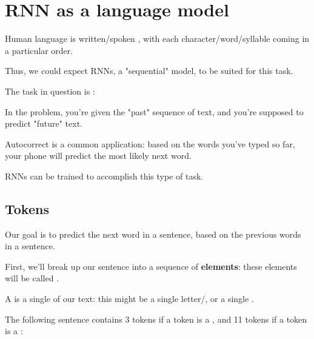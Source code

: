 \pagebreak

\section{RNN as a language model}

    Human language is written/spoken , with each character/word/syllable coming in a particular order.

    Thus, we could expect RNNs, a "sequential" model, to be suited for this task.

    The task in question is :\\

    \begin{definition}
        In the  problem, you're given the "past" sequence of text, and you're supposed to predict "future" text.
    \end{definition}

    \miniex Autocorrect is a common application: based on the words you've typed so far, your phone will predict the most likely next word.

    RNNs can be trained to accomplish this type of task.

    \subsection{Tokens}

        Our goal is to  predict the next word in a sentence, based on the previous words in a sentence.

        First, we'll break up our sentence into a sequence of \textbf{elements}: these elements will be called .\\

        \begin{definition}
            A  is a single  of our text: this might be a single letter/, or a single .
        \end{definition}
        

        \miniex The following sentence contains 3 tokens if a token is a , and 11 tokens if a token is a :


